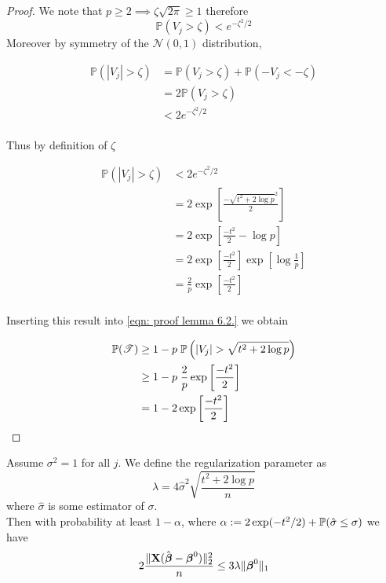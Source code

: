 \begin{proof}
    We note that $p \geq 2 \implies \zeta \sqrt{2 \pi} \geq 1$ therefore
    $$
        \mathbb{P}(V_j > \zeta) <  e^{-\zeta^2/2}
    $$
    Moreover by symmetry of the $\mathscr{N} (0,1)$ distribution,

    \begin{align*}
        \mathbb{P} (|V_j| > \zeta) & = \mathbb{P} (V_j > \zeta) + \mathbb{P} (- V_j < - \zeta) \\
                                   & = 2 \mathbb{P} (V_j > \zeta)                              \\
                                   & < 2 e^{-\zeta^2/2}                                        \\
    \end{align*}

    Thus by definition of $\zeta$

    \begin{align*}
        \mathbb{P} (|V_j| > \zeta) & < 2 e^{-\zeta^2/2}                                                             \\
                                   & = 2 \exp \left[ \frac{- \sqrt{t^{2} + 2 \log p} ^2}{2} \right]                 \\
                                   & = 2 \exp \left[ \frac{- t^{2}}{2} - \log p \right]                             \\
                                   & = 2 \exp \left[ \frac{- t^{2}}{2} \right] \exp \left[ \log \frac{1}{p} \right] \\
                                   & = \frac{2}{p} \exp \left[ \frac{- t^{2}}{2} \right]                            \\
    \end{align*}

    Inserting this result into \eqref{eqn: proof lemma 6.2.} we obtain

    \begin{align*}
        \mathbb{P}(\mathscr{T}) & \geq 1 - p \; \P \left( | V_{j} | > \sqrt{t^{2}+2 \log p}  \right) \\
                                & \geq 1 - p \; \frac{2}{p} \exp \left[ \frac{- t^{2}}{2} \right]    \\
                                & = 1 - 2 \exp \left[ \frac{- t^{2}}{2} \right]                      \\
    \end{align*}
\end{proof}

\begin{corollary}
    Assume $\sigma^2 = 1$ for all $j$. We define the regularization parameter as
    $$\lambda = 4 \hat \sigma^2 \sqrt{\frac{t^2 + 2 \log p}{n}}$$
    where $\hat \sigma$ is some estimator of $\sigma$. \\
    Then with probability at least $1 - \alpha$, where $\alpha := 2 \exp(-t^2/2) + \P (\hat \sigma \leq \sigma)$ we have
    $$2 \frac{\| \X (\hat \bta - \bta^0)\|_2^2}{n} \leq 3 \lambda \| \bta^0 \|_1$$
\end{corollary}

